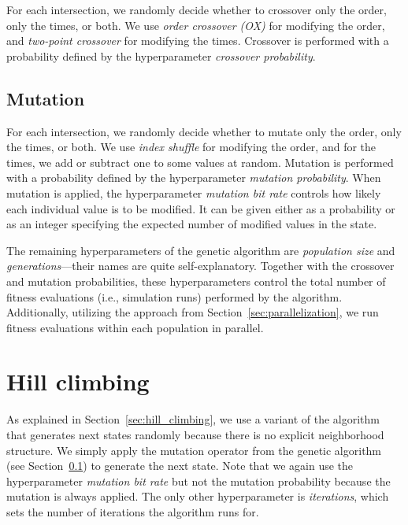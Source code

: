 For each intersection, we randomly decide whether to crossover only the order, only the times, or both. We use \textit{order crossover (OX)} for modifying the order, and \textit{two-point crossover} for modifying the times. Crossover is performed with a probability defined by the hyperparameter \textit{crossover probability}.

\subsection{Mutation} \label{sec:mutation_application}

For each intersection, we randomly decide whether to mutate only the order, only the times, or both. We use \textit{index shuffle} for modifying the order, and for the times, we add or subtract one to some values at random. Mutation is performed with a probability defined by the hyperparameter \textit{mutation probability}. When mutation is applied, the hyperparameter \textit{mutation bit rate} controls how likely each individual value is to be modified. It can be given either as a probability or as an integer specifying the expected number of modified values in the state.

\bigskip

The remaining hyperparameters of the genetic algorithm are \textit{population size} and \textit{generations}---their names are quite self-explanatory. Together with the crossover and mutation probabilities, these hyperparameters control the total number of fitness evaluations (i.e., simulation runs) performed by the algorithm.
Additionally, utilizing the approach from Section~\ref{sec:parallelization}, we run fitness evaluations within each population in parallel.

\section{Hill climbing} \label{sec:hill_climbing_application}

As explained in Section~\ref{sec:hill_climbing}, we use a variant of the algorithm that generates next states randomly because there is no explicit neighborhood structure. We simply apply the mutation operator from the genetic algorithm (see Section~\ref{sec:mutation_application}) to generate the next state. Note that we again use the hyperparameter \textit{mutation bit rate} but not the mutation probability because the mutation is always applied. The only other hyperparameter is \textit{iterations}, which sets the number of iterations the algorithm runs for.

